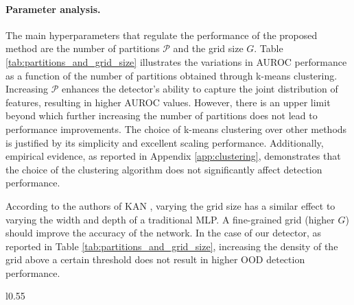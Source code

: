 \paragraph{Parameter analysis.}
The main hyperparameters that regulate the performance of the proposed method are the number of partitions $\mathcal{P}$ and the grid size $G$.
Table \ref{tab:partitions_and_grid_size} illustrates the variations in AUROC performance as a function of the number of partitions obtained through k-means clustering. 
Increasing $\mathcal{P}$ enhances the detector's ability to capture the joint distribution of features, resulting in higher AUROC values. 
However, there is an upper limit beyond which further increasing the number of partitions does not lead to performance improvements.
The choice of k-means clustering over other methods is justified by its simplicity and excellent scaling performance. Additionally, empirical evidence, as reported in Appendix \ref{app:clustering}, demonstrates that the choice of the clustering algorithm does not significantly affect detection performance.

According to the authors of KAN \citep{liu2024kankolmogorovarnoldnetworks}, varying the grid size has a similar effect to varying the width and depth of a traditional MLP. 
A fine-grained grid (higher \(G\)) should improve the accuracy of the network. 
In the case of our detector, as reported in Table \ref{tab:partitions_and_grid_size}, increasing the density of the grid above a certain threshold does not result in higher OOD detection performance.



\begin{wraptable}{l}{0.55\textwidth}
    \centering
    \caption{KAN detector performance \textit{w.r.t} different datasets partitions and grid sizes over CIFAR-10.}
    \label{tab:partitions_and_grid_size}
\end{wraptable}





